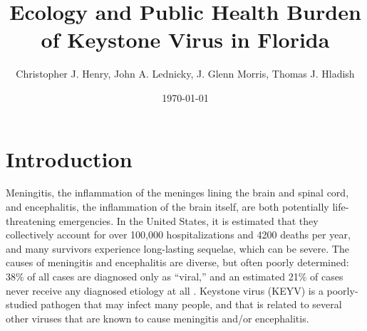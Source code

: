 \documentclass[12pt]{article}
\title%
{Ecology and Public Health Burden of Keystone Virus in Florida}
\author%
{Christopher J. Henry, John A. Lednicky, J. Glenn Morris, Thomas J. Hladish}
\date{\today}
\newcommand{\cjh}{\textcolor{blue}{cjh}}
\newcommand{\tjh}{\textcolor{red}{tjh}}
\newcommand{\msg}[3]{(#1 $\rightarrow$ #2: #3)}
\newcommand{\mtc}[1]{\msg\tjh\cjh{#1}}
\begin{document}
    \maketitle

    


    \section{Introduction}
        \label{intro}

        Meningitis, the inflammation of the meninges lining the brain and spinal cord, and encephalitis, the inflammation of the brain itself, are both potentially life-threatening emergencies. In the United States, it is estimated that they collectively account for over 100,000 hospitalizations and 4200 deaths per year\cite{george2014encephalitis,holmquist2008meningitis}, and many survivors experience long-lasting sequelae, which can be severe. The causes of meningitis and encephalitis are diverse, but often poorly determined: 38\% of all cases are diagnosed only as ``viral,'' and an estimated 21\% of cases never receive any diagnosed etiology at all \cite{george2014encephalitis,holmquist2008meningitis}. Keystone virus (KEYV) is a poorly-studied pathogen that may infect many people, and that is related to several other viruses that are known to cause meningitis and/or encephalitis.
\end{document}
